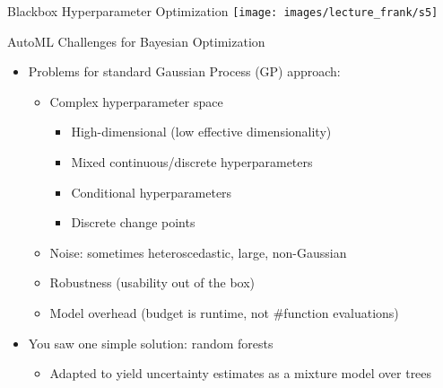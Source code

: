 \begin{frame}[c]{Blackbox Hyperparameter Optimization}
	\centering
	\texttt{[image: images/lecture\_frank/s5]}
\end{frame}
\begin{frame}[c]{AutoML Challenges for Bayesian Optimization}
\begin{itemize}
	\item Problems for standard Gaussian Process (GP) approach:
	\begin{itemize}
		\item \alert{Complex hyperparameter space}
		\begin{itemize}
			\item High-dimensional (low effective dimensionality)
			\item Mixed continuous/discrete hyperparameters
			\item Conditional hyperparameters
			\item Discrete change points
		\end{itemize}
		\item \alert{Noise}: sometimes heteroscedastic, large, non-Gaussian
		\item \alert{Robustness} (usability out of the box)
		\item Model \alert{overhead} (budget is runtime, not \#function evaluations)
	\end{itemize}
	\item You saw one simple solution: \alert{random forests} 
	\begin{itemize}
		\item Adapted to yield uncertainty estimates
		as a mixture model over trees
	\end{itemize}
\end{itemize}
\end{frame}
